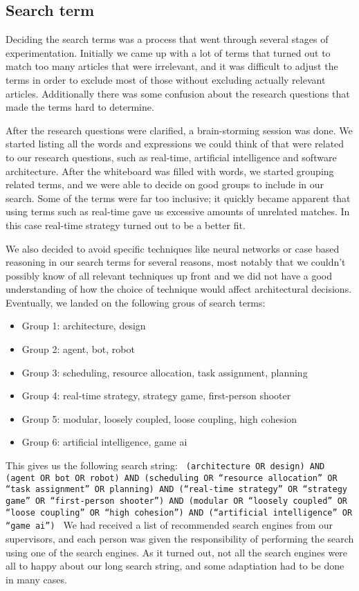 \subsection{Search term}
\label{sub:search_term}

Deciding the search terms was a process that went through several stages of experimentation. Initially we came up with a lot of terms that turned out to match too many articles that were irrelevant, and it was difficult to adjust the terms in order to exclude most of those without excluding actually relevant articles. Additionally there was some confusion about the research questions that made the terms hard to determine.

After the research questions were clarified, a brain-storming session was done. We started listing all the words and expressions we could think of that were related to our research questions, such as real-time, artificial intelligence and software architecture. After the whiteboard was filled with words, we started grouping related terms, and we were able to decide on good groups to include in our search. Some of the terms were far too inclusive; it quickly became apparent that using terms such as real-time gave us excessive amounts of unrelated matches. In this case real-time strategy turned out to be a better fit.

We also decided to avoid specific techniques like neural networks or case based reasoning in our search terms for several reasons, most notably that we couldn’t possibly know of all relevant techniques up front and we did not have a good understanding of how the choice of technique would affect architectural decisions. Eventually, we landed on the following grous of search terms:

\begin{itemize}

\item Group 1: architecture, design
\item Group 2: agent, bot, robot
\item Group 3: scheduling, resource allocation, task assignment, planning
\item Group 4: real-time strategy, strategy game, first-person shooter
\item Group 5: modular, loosely coupled, loose coupling, high cohesion
\item Group 6: artificial intelligence, game ai

\end{itemize}
This gives us the following search  string:
\texttt{%
(architecture OR design)
AND (agent OR bot OR robot)
AND (scheduling OR “resource allocation” OR “task assignment” OR planning)
AND (“real-time strategy” OR “strategy game” OR “first-person shooter”)
AND (modular OR “loosely coupled” OR “loose coupling” OR “high cohesion”)
AND (“artificial intelligence” OR “game ai”)
}
We had received a list of recommended search engines from our supervisors, and each person was given the responsibility of performing the search using one of the search engines. As it turned out, not all the search engines were all to happy about our long search string, and some adaptiation had to be done in many cases.

